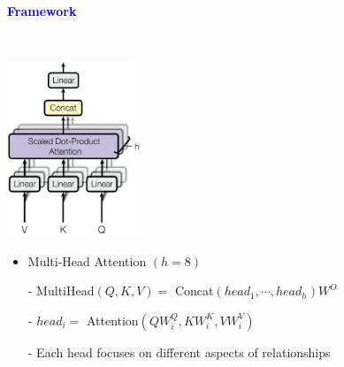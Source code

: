 \documentclass[professionalfont]{beamer}
\begin{document}
\begin{frame}

\begin{center}
    { \textbf{\textcolor{blue}{ {\fontsize{12}{14}\selectfont Framework} }} }
\end{center}
\\[0.2cm]

\begin{center}
    \includegraphics[width=0.3\textwidth]{figure/2.png}
\end{center}

\begin{itemize}
    \item Multi-Head Attention \( (h=8) \)

    - MultiHead\( (Q,K,V) = \) Concat\( (head_1, \cdots , head_h)W^O \)

    - \( head_i = \) Attention\( (QW_i^Q, KW_i^K, VW_i^V) \)

    - Each head focuses on different aspects of relationships
\end{itemize}

\end{frame}
\end{document}

